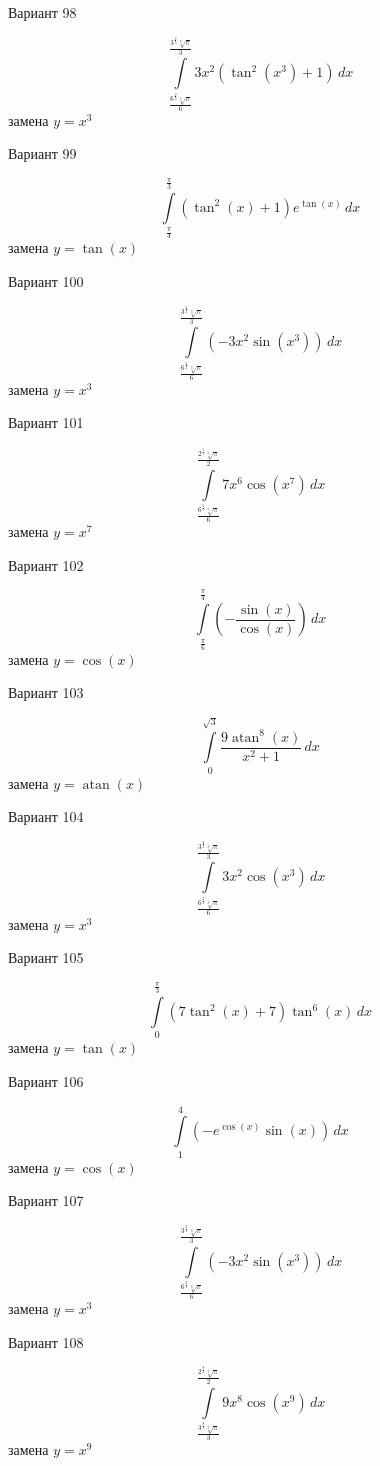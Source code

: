 \documentclass[11pt]{report}
\begin{document}
Вариант 98

$$\int\limits_{\frac{6^{\frac{2}{3}} \sqrt[3]{\pi}}{6}}^{\frac{3^{\frac{2}{3}} \sqrt[3]{\pi}}{3}} 3 x^{2} \left(\tan^{2}{\left(x^{3} \right)} + 1\right)\, dx$$
замена $y = x^{3}$

Вариант 99

$$\int\limits_{\frac{\pi}{4}}^{\frac{\pi}{3}} \left(\tan^{2}{\left(x \right)} + 1\right) e^{\tan{\left(x \right)}}\, dx$$
замена $y = \tan{\left(x \right)}$

Вариант 100

$$\int\limits_{\frac{6^{\frac{2}{3}} \sqrt[3]{\pi}}{6}}^{\frac{3^{\frac{2}{3}} \sqrt[3]{\pi}}{3}} \left(- 3 x^{2} \sin{\left(x^{3} \right)}\right)\, dx$$
замена $y = x^{3}$

Вариант 101

$$\int\limits_{\frac{6^{\frac{6}{7}} \sqrt[7]{\pi}}{6}}^{\frac{2^{\frac{5}{7}} \sqrt[7]{\pi}}{2}} 7 x^{6} \cos{\left(x^{7} \right)}\, dx$$
замена $y = x^{7}$

Вариант 102

$$\int\limits_{\frac{\pi}{6}}^{\frac{\pi}{4}} \left(- \frac{\sin{\left(x \right)}}{\cos{\left(x \right)}}\right)\, dx$$
замена $y = \cos{\left(x \right)}$

Вариант 103

$$\int\limits_{0}^{\sqrt{3}} \frac{9 \operatorname{atan}^{8}{\left(x \right)}}{x^{2} + 1}\, dx$$
замена $y = \operatorname{atan}{\left(x \right)}$

Вариант 104

$$\int\limits_{\frac{6^{\frac{2}{3}} \sqrt[3]{\pi}}{6}}^{\frac{3^{\frac{2}{3}} \sqrt[3]{\pi}}{3}} 3 x^{2} \cos{\left(x^{3} \right)}\, dx$$
замена $y = x^{3}$

Вариант 105

$$\int\limits_{0}^{\frac{\pi}{3}} \left(7 \tan^{2}{\left(x \right)} + 7\right) \tan^{6}{\left(x \right)}\, dx$$
замена $y = \tan{\left(x \right)}$

Вариант 106

$$\int\limits_{1}^{4} \left(- e^{\cos{\left(x \right)}} \sin{\left(x \right)}\right)\, dx$$
замена $y = \cos{\left(x \right)}$

Вариант 107

$$\int\limits_{\frac{6^{\frac{2}{3}} \sqrt[3]{\pi}}{6}}^{\frac{3^{\frac{2}{3}} \sqrt[3]{\pi}}{3}} \left(- 3 x^{2} \sin{\left(x^{3} \right)}\right)\, dx$$
замена $y = x^{3}$

Вариант 108

$$\int\limits_{\frac{3^{\frac{8}{9}} \sqrt[9]{\pi}}{3}}^{\frac{2^{\frac{8}{9}} \sqrt[9]{\pi}}{2}} 9 x^{8} \cos{\left(x^{9} \right)}\, dx$$
замена $y = x^{9}$
\end{document}
